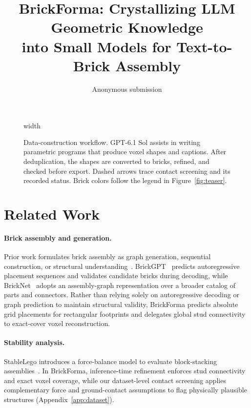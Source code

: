 \documentclass[letterpaper]{article} %
\title{BrickForma: Crystallizing LLM Geometric Knowledge\\into Small Models for Text-to-Brick Assembly}
\author{Anonymous submission}
\begin{document}
\maketitle




\begin{figure}[t]
\centering
\begingroup
\pdfximage width \textwidth {figure2.pdf}%
\pdfrefximage\pdflastximage\endgroup
\caption{Data-construction workflow. GPT-6.1 Sol assists in writing parametric programs that produce voxel shapes and captions. After deduplication, the shapes are converted to bricks, refined, and checked before export. Dashed arrows trace contact screening and its recorded status. Brick colors follow the legend in Figure~\ref{fig:teaser}.}
\label{fig:data-workflow}
\end{figure}

\section{Related Work}
\paragraph{Brick assembly and generation.}
Prior work formulates brick assembly as graph generation, sequential construction, or structural understanding~\cite{thompson2020lego,brickbybrick,breakandmake}. BrickGPT~\cite{brickgpt} predicts autoregressive placement sequences and validates candidate bricks during decoding, while BrickNet~\cite{bricknet} adopts an assembly-graph representation over a broader catalog of parts and connectors. Rather than relying solely on autoregressive decoding or graph prediction to maintain structural validity, BrickForma predicts absolute grid placements for rectangular footprints and delegates global stud connectivity to exact-cover voxel reconstruction.

\paragraph{Stability analysis.}
StableLego introduces a force-balance model to evaluate block-stacking assemblies~\cite{stablelego}. In BrickForma, inference-time refinement enforces stud connectivity and exact voxel coverage, while our dataset-level contact screening applies complementary force and ground-contact assumptions to flag physically plausible structures (Appendix~\ref{app:dataset}).
\end{document}
